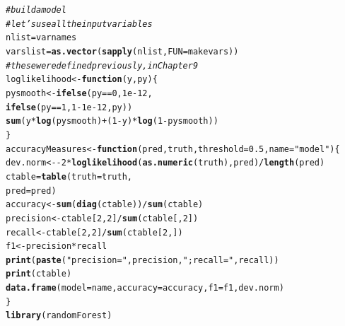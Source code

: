 \documentclass{article}\usepackage[]{graphicx}\usepackage[]{color}
\makeatletter
\newcommand{\hlnum}[1]{\textcolor[rgb]{0.686,0.059,0.569}{#1}}%
\newcommand{\hlstr}[1]{\textcolor[rgb]{0.192,0.494,0.8}{#1}}%
\newcommand{\hlcom}[1]{\textcolor[rgb]{0.678,0.584,0.686}{\textit{#1}}}%
\newcommand{\hlopt}[1]{\textcolor[rgb]{0,0,0}{#1}}%
\newcommand{\hlstd}[1]{\textcolor[rgb]{0.345,0.345,0.345}{#1}}%
\newcommand{\hlkwa}[1]{\textcolor[rgb]{0.161,0.373,0.58}{\textbf{#1}}}%
\newcommand{\hlkwb}[1]{\textcolor[rgb]{0.69,0.353,0.396}{#1}}%
\newcommand{\hlkwc}[1]{\textcolor[rgb]{0.333,0.667,0.333}{#1}}%
\newcommand{\hlkwd}[1]{\textcolor[rgb]{0.737,0.353,0.396}{\textbf{#1}}}%
\newenvironment{kframe}{%
 \def\at@end@of@kframe{}%
 \ifinner\ifhmode%
  \def\at@end@of@kframe{\end{minipage}}%
  \begin{minipage}{\columnwidth}%
 \fi\fi%
 \def\FrameCommand##1{\hskip\@totalleftmargin \hskip-\fboxsep
 \colorbox{shadecolor}{##1}\hskip-\fboxsep
     \hskip-\linewidth \hskip-\@totalleftmargin \hskip\columnwidth}%
 \MakeFramed {\advance\hsize-\width
   \@totalleftmargin\z@ \linewidth\hsize
   \@setminipage}}%
 {\par\unskip\endMakeFramed%
 \at@end@of@kframe}
\newenvironment{knitrout}{}{} %
\makeatother
\begin{document}
\begin{knitrout}
\color{fgcolor}\begin{kframe}
\begin{alltt}
\hlcom{# build a model}
\hlcom{# let's use all the input variables}
\hlstd{nlist} \hlkwb{=} \hlstd{varnames}
\hlstd{varslist} \hlkwb{=} \hlkwd{as.vector}\hlstd{(}\hlkwd{sapply}\hlstd{(nlist,} \hlkwc{FUN}\hlstd{=makevars))}
\hlcom{# these were defined previously,  in Chapter 9}
\hlstd{loglikelihood} \hlkwb{<-} \hlkwa{function}\hlstd{(}\hlkwc{y}\hlstd{,} \hlkwc{py}\hlstd{) \{}
  \hlstd{pysmooth} \hlkwb{<-} \hlkwd{ifelse}\hlstd{(py}\hlopt{==}\hlnum{0}\hlstd{,} \hlnum{1e-12}\hlstd{,}
                     \hlkwd{ifelse}\hlstd{(py}\hlopt{==}\hlnum{1}\hlstd{,} \hlnum{1}\hlopt{-}\hlnum{1e-12}\hlstd{, py))}
  \hlkwd{sum}\hlstd{(y} \hlopt{*} \hlkwd{log}\hlstd{(pysmooth)} \hlopt{+} \hlstd{(}\hlnum{1}\hlopt{-}\hlstd{y)}\hlopt{*}\hlkwd{log}\hlstd{(}\hlnum{1} \hlopt{-} \hlstd{pysmooth))}
\hlstd{\}}
\hlstd{accuracyMeasures} \hlkwb{<-} \hlkwa{function}\hlstd{(}\hlkwc{pred}\hlstd{,} \hlkwc{truth}\hlstd{,} \hlkwc{threshold}\hlstd{=}\hlnum{0.5}\hlstd{,} \hlkwc{name}\hlstd{=}\hlstr{"model"}\hlstd{) \{}
  \hlstd{dev.norm} \hlkwb{<-} \hlopt{-}\hlnum{2}\hlopt{*}\hlkwd{loglikelihood}\hlstd{(}\hlkwd{as.numeric}\hlstd{(truth), pred)}\hlopt{/}\hlkwd{length}\hlstd{(pred)}
  \hlstd{ctable} \hlkwb{=} \hlkwd{table}\hlstd{(}\hlkwc{truth}\hlstd{=truth,}
                 \hlkwc{pred}\hlstd{=pred)}
  \hlstd{accuracy} \hlkwb{<-} \hlkwd{sum}\hlstd{(}\hlkwd{diag}\hlstd{(ctable))}\hlopt{/}\hlkwd{sum}\hlstd{(ctable)}
  \hlstd{precision} \hlkwb{<-} \hlstd{ctable[}\hlnum{2}\hlstd{,}\hlnum{2}\hlstd{]}\hlopt{/}\hlkwd{sum}\hlstd{(ctable[,}\hlnum{2}\hlstd{])}
  \hlstd{recall} \hlkwb{<-} \hlstd{ctable[}\hlnum{2}\hlstd{,}\hlnum{2}\hlstd{]}\hlopt{/}\hlkwd{sum}\hlstd{(ctable[}\hlnum{2}\hlstd{,])}
  \hlstd{f1} \hlkwb{<-} \hlstd{precision}\hlopt{*}\hlstd{recall}
  \hlkwd{print}\hlstd{(}\hlkwd{paste}\hlstd{(}\hlstr{"precision="}\hlstd{, precision,} \hlstr{"; recall="} \hlstd{, recall))}
  \hlkwd{print}\hlstd{(ctable)}
  \hlkwd{data.frame}\hlstd{(}\hlkwc{model}\hlstd{=name,} \hlkwc{accuracy}\hlstd{=accuracy,} \hlkwc{f1}\hlstd{=f1, dev.norm)}
\hlstd{\}}
\hlkwd{library}\hlstd{(randomForest)}
\end{alltt}



\end{kframe}
\end{knitrout}
\end{document}
